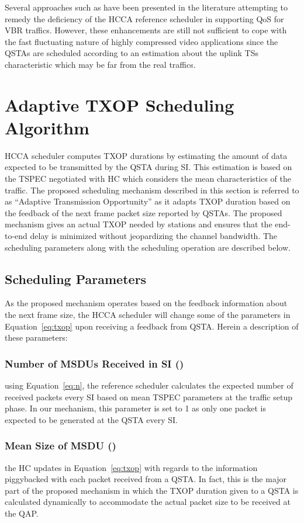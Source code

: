 \documentclass[a4paper, conference]{IEEEtran}
\begin{document}
\hspace{1mm}Several approaches such as \cite{Lee2009, Jansang2011, Cecchetti2012, cecchettielAL2012, ruscelli2013} have been presented in the literature attempting to remedy the deficiency of the HCCA reference scheduler in supporting QoS for VBR traffics. However, these enhancements are still not sufficient to cope with the fast fluctuating nature of highly compressed video applications since the QSTAs are scheduled according to an estimation about the uplink TSs characteristic which may be far from the real traffics.

\section{Adaptive TXOP Scheduling Algorithm}
\label{sec:ATAV}
HCCA scheduler computes TXOP durations by estimating the amount of data expected to be transmitted by the QSTA during SI. This estimation is based on the TSPEC negotiated with HC which considers the mean characteristics of the traffic. The proposed scheduling mechanism described in this section is referred to as “Adaptive Transmission Opportunity” as it adapts TXOP duration based on the feedback of the next frame packet size reported by QSTAs. The proposed mechanism gives an actual TXOP needed by stations and ensures that the end-to-end delay is minimized without jeopardizing the channel bandwidth. The scheduling parameters along with the scheduling operation are described below.

\subsection{Scheduling Parameters}
As the proposed mechanism operates based on the feedback information about the next frame size, the HCCA scheduler will change  some of the parameters in Equation~\eqref{eq:txop} upon receiving a feedback from QSTA. Herein a description of these parameters:

\subsubsection{Number of MSDUs Received in SI ()} using Equation~\eqref{eq:n}, the reference scheduler calculates the expected number of received packets every SI based on mean TSPEC parameters at the traffic setup phase. In our mechanism, this parameter is set to 1 as only one packet is expected to be generated at the QSTA every SI.
\label{enm:N_i}
\subsubsection{Mean Size of MSDU ()} the HC updates  in Equation~\eqref{eq:txop} with regards to the information piggybacked with each packet received from a QSTA. In fact, this is the major part of the proposed mechanism in which the TXOP duration given to a QSTA is calculated dynamically to accommodate the actual packet size to be received at the QAP.
\label{enm:L_i}
\end{document}
